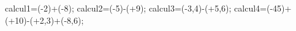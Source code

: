 \documentclass[exercice]{thedocument}%
\begin{document}
%
\>calcul1=(-2)+(-8);%
\>calcul2=(-5)-(+9);%
\>calcul3=(-3,4)-(+5,6);%
\>calcul4=(-45)+(+10)-(+2,3)+(-8,6);%
%
\end{document}
